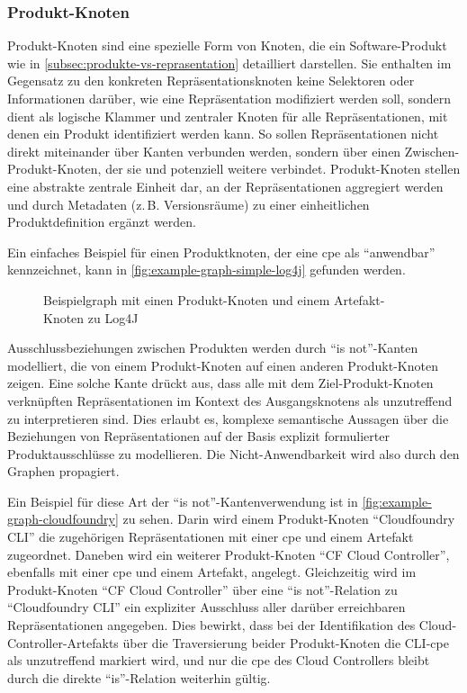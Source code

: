 \subsubsection{Produkt-Knoten}\label{subsubsec:model-product-node}
Produkt-Knoten sind eine spezielle Form von Knoten, die ein Software-Produkt wie in \autoref{subsec:produkte-vs-reprasentation} detailliert darstellen.
Sie enthalten im Gegensatz zu den konkreten Repräsentationsknoten keine Selektoren oder Informationen darüber, wie eine Repräsentation modifiziert werden soll, sondern dient als logische Klammer und zentraler Knoten für alle Repräsentationen, mit denen ein Produkt identifiziert werden kann.
So sollen Repräsentationen nicht direkt miteinander über Kanten verbunden werden, sondern über einen Zwischen-Produkt-Knoten, der sie und potenziell weitere verbindet.
Produkt-Knoten stellen eine abstrakte zentrale Einheit dar, an der Repräsentationen aggregiert werden und durch Metadaten (z.\,B. Versionsräume) zu einer einheitlichen Produktdefinition ergänzt werden.

Ein einfaches Beispiel für einen Produktknoten, der eine \acrshort{cpe} als \enquote{anwendbar} kennzeichnet, kann in \autoref{fig:example-graph-simple-log4j} gefunden werden.

\begin{figure}[htbp]
    \centering
    \makebox[\textwidth]{}
    \caption{Beispielgraph mit einen Produkt-Knoten und einem Artefakt-Knoten zu Log4J}
    \label{fig:example-graph-simple-log4j}
\end{figure}

Ausschlussbeziehungen zwischen Produkten werden durch \enquote{is not}-Kanten modelliert, die von einem Produkt-Knoten auf einen anderen Produkt-Knoten zeigen.
Eine solche Kante drückt aus, dass alle mit dem Ziel-Produkt-Knoten verknüpften Repräsentationen im Kontext des Ausgangsknotens als unzutreffend zu interpretieren sind.
Dies erlaubt es, komplexe semantische Aussagen über die Beziehungen von Repräsentationen auf der Basis explizit formulierter Produktausschlüsse zu modellieren.
Die Nicht-Anwendbarkeit wird also durch den Graphen propagiert.

Ein Beispiel für diese Art der \enquote{is not}-Kantenverwendung ist in \autoref{fig:example-graph-cloudfoundry} zu sehen.
Darin wird einem Produkt-Knoten \enquote{Cloudfoundry CLI} die zugehörigen Repräsentationen mit einer \acrshort{cpe} und einem Artefakt zugeordnet.
Daneben wird ein weiterer Produkt-Knoten \enquote{CF Cloud Controller}, ebenfalls mit einer \acrshort{cpe} und einem Artefakt, angelegt.
Gleichzeitig wird im Produkt-Knoten \enquote{CF Cloud Controller} über eine \enquote{is not}-Relation zu \enquote{Cloudfoundry CLI} ein expliziter Ausschluss aller darüber erreichbaren Repräsentationen angegeben.
Dies bewirkt, dass bei der Identifikation des Cloud-Controller-Artefakts über die Traversierung beider Produkt-Knoten die CLI-\acrshort{cpe} als unzutreffend markiert wird, und nur die \acrshort{cpe} des Cloud Controllers bleibt durch die direkte \enquote{is}-Relation weiterhin gültig.

